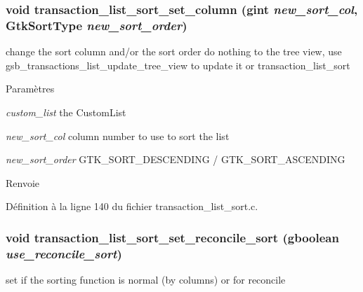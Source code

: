 \subsubsection[{transaction\_\-list\_\-sort\_\-set\_\-column}]{\setlength{\rightskip}{0pt plus 5cm}void transaction\_\-list\_\-sort\_\-set\_\-column (gint {\em new\_\-sort\_\-col}, \/  GtkSortType {\em new\_\-sort\_\-order})}\label{transaction__list__sort_8c_ad124c81fa4121869ac23b1e67a96a9d2}
change the sort column and/or the sort order do nothing to the tree view, use gsb\_\-transactions\_\-list\_\-update\_\-tree\_\-view to update it or transaction\_\-list\_\-sort


\begin{DoxyParams}{Paramètres}
\item[{\em custom\_\-list}]the CustomList \item[{\em new\_\-sort\_\-col}]column number to use to sort the list \item[{\em new\_\-sort\_\-order}]GTK\_\-SORT\_\-DESCENDING / GTK\_\-SORT\_\-ASCENDING\end{DoxyParams}
\begin{DoxyReturn}{Renvoie}

\end{DoxyReturn}


Définition à la ligne 140 du fichier transaction\_\-list\_\-sort.c.

\subsubsection[{transaction\_\-list\_\-sort\_\-set\_\-reconcile\_\-sort}]{\setlength{\rightskip}{0pt plus 5cm}void transaction\_\-list\_\-sort\_\-set\_\-reconcile\_\-sort (gboolean {\em use\_\-reconcile\_\-sort})}\label{transaction__list__sort_8c_aa6a0e83f7d489f7a8cf4e0083d5c2360}
set if the sorting function is normal (by columns) or for reconcile


